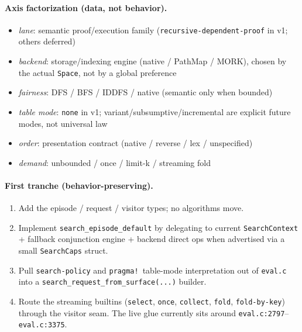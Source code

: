 \documentclass[11pt]{article}
\newcommand{\code}[1]{\texttt{#1}}
\newcommand{\PathMap}{\textup{PathMap}}
\newcommand{\MORK}{\textup{MORK}}
\begin{document}
\paragraph{Axis factorization (data, not behavior).}
\begin{itemize}
\item \emph{lane}: semantic proof/execution family
  (\code{recursive-dependent-proof} in v1; others deferred)
\item \emph{backend}: storage/indexing engine (native / \PathMap{} /
  \MORK{}), chosen by the actual \code{Space}, not by a global preference
\item \emph{fairness}: DFS / BFS / IDDFS / native (semantic only when
  bounded)
\item \emph{table mode}: \code{none} in v1; variant/subsumptive/incremental
  are explicit future modes, not universal law
\item \emph{order}: presentation contract (native / reverse / lex /
  unspecified)
\item \emph{demand}: unbounded / once / limit-k / streaming fold
\end{itemize}

\paragraph{First tranche (behavior-preserving).}
\begin{enumerate}
\item Add the episode / request / visitor types; no algorithms move.
\item Implement \code{search\_episode\_default} by delegating to
  current \code{SearchContext} + fallback conjunction engine + backend
  direct ops when advertised via a small \code{SearchCaps} struct.
\item Pull \code{search-policy} and \code{pragma!}\ table-mode
  interpretation out of \code{eval.c} into a
  \code{search\_request\_from\_surface(...)} builder.
\item Route the streaming builtins (\code{select}, \code{once},
  \code{collect}, \code{fold}, \code{fold-by-key}) through the visitor
  seam.  The live glue currently sits around
  \code{eval.c:2797}--\code{eval.c:3375}.
\end{enumerate}
\end{document}
